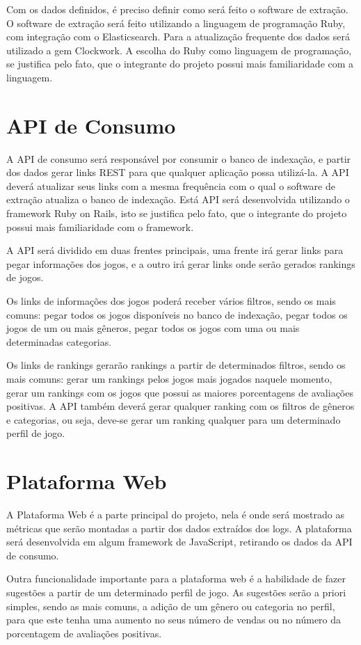 Com os dados definidos, é preciso definir como será feito o software de extração. O software de extração será feito utilizando a linguagem de programação Ruby, com integração com o Elasticsearch. Para a atualização frequente dos dados será utilizado a gem Clockwork. A escolha do Ruby como linguagem de programação, se justifica pelo fato, que o integrante do projeto possui mais familiaridade com a linguagem.
\section{API de Consumo}
A API de consumo será responsável por consumir o banco de indexação, e partir dos dados gerar links REST para que qualquer aplicação possa utilizá-la. A API deverá atualizar seus links com a mesma frequência com o qual o software de extração atualiza o banco de indexação. Está API será desenvolvida utilizando o framework Ruby on Rails, isto se justifica pelo fato, que o integrante do projeto possui mais familiaridade com o framework.

A API será dividido em duas frentes principais, uma frente irá gerar links para pegar informações dos jogos, e a outro irá gerar links onde serão gerados rankings de jogos.

Os links de informações dos jogos poderá receber vários filtros, sendo os mais comuns: pegar todos os jogos disponíveis no banco de indexação, pegar todos os jogos de um ou mais gêneros, pegar todos os jogos com uma ou mais determinadas categorias.

Os links de rankings gerarão rankings a partir de determinados filtros, sendo os mais comuns: gerar um rankings pelos jogos mais jogados naquele momento, gerar um rankings com os jogos que possui as maiores porcentagens de avaliações positivas. A API também deverá gerar qualquer ranking com os filtros de gêneros e categorias, ou seja, deve-se gerar um ranking qualquer para um determinado perfil de jogo.
\section{Plataforma Web}
A Plataforma Web é a parte principal do projeto, nela é onde será mostrado as métricas que serão montadas a partir dos dados extraídos dos logs. A plataforma será desenvolvida em algum framework de JavaScript, retirando os dados da API de consumo.

Outra funcionalidade importante para a plataforma web é a habilidade de fazer sugestões a partir de um determinado perfil de jogo. As sugestões serão a priori simples, sendo as mais comuns, a adição de um gênero ou categoria no perfil, para que este tenha uma aumento no seus número de vendas ou no número da porcentagem de avaliações positivas.

